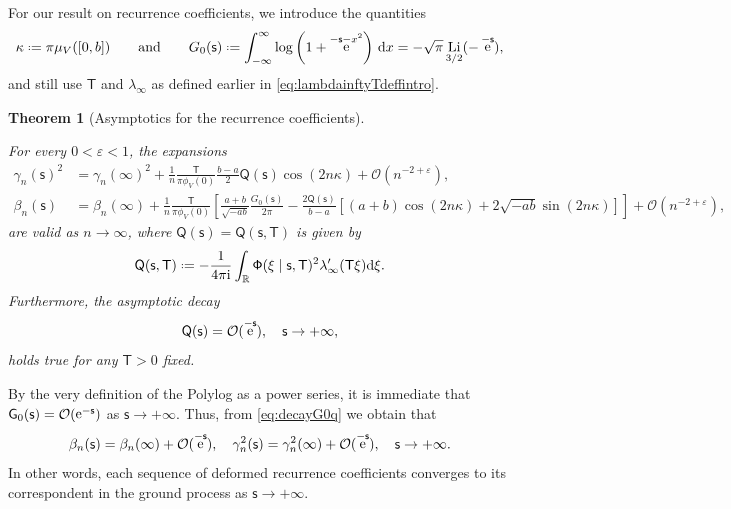 \documentclass[reqno,a4paper,11pt]{amsart}
\DeclareMathOperator{\ee}{\rm e}
\newcommand{\R}{\mathbb{R}}
\newcommand{\Boh}{\mathcal{O}}
\newcommand{\ii}{\mathrm{i}}
\newcommand{\dd}{\mathrm{d}}
\newcommand*{\deff}{\mathrel{\vcenter{\baselineskip0.5ex \lineskiplimit0pt
                     \hbox{\scriptsize.}\hbox{\scriptsize.}}}%
                     =}
\DeclareMathOperator{\Li}{Li}
\newcommand{\msf}{\mathsf}
\newcommand{\Tad}{\msf T}
\newcommand{\sad}{\msf s}
\newtheorem{theorem}{Theorem}[section]
\theoremstyle{definition}
\theoremstyle{remark}
\numberwithin{equation}{section}
\newcommand*{\defeq}{\mathrel{\vcenter{\baselineskip0.5ex \lineskiplimit0pt
                     \hbox{\scriptsize.}\hbox{\scriptsize.}}}%
                     =}
\begin{document}
For our result on recurrence coefficients, we introduce the quantities
%
    \[
        \kappa \defeq \pi \mu_V([0,b]) \qquad \text{and}\qquad
        G_0(\sad) \defeq  \int_{-\infty}^\infty \log \left(1 + \ee^{- \sad - x^2} \right) \, \dd x=-\sqrt{\pi}\Li_{3/2}(-\ee^{-\sad}),
    \]
and still use $\msf T$ and $\msf \lambda_\infty$ as defined earlier in \eqref{eq:lambdainftyTdeffintro}.

\begin{theorem}[Asymptotics for the recurrence coefficients] \label{thm:recurrence coeffs}
    
    For every $0 < \varepsilon < 1$, the expansions
\begin{equation}\label{eq:expRCmain}
    \begin{split}
    \gamma_n(\sad)^2 
        &= \gamma_n(\infty)^2 + \frac{1}{n} \frac{\Tad}{\pi \phi_V(0)} \frac{b-a}{2} \msf Q(\sad) \cos \left(2n \kappa \right) + \Boh(n^{-2 + \varepsilon}), \\
    \beta_n(\sad)
        &= \beta_n(\infty) + \frac{1}{n} \frac{\msf T}{\pi \phi_V(0)}\left[ \frac{a+b}{\sqrt{-ab}} \frac{G_0(\sad)}{2 \pi } -  \frac{2\msf Q(\sad)}{b-a} \left[ (a+b) \cos(2n \kappa) + 2 \sqrt{-ab} \sin (2n\kappa)\right]\right] + \Boh(n^{-2 + \varepsilon}),
    \end{split}
\end{equation}
%
are valid as $n\to \infty$, where $\msf Q(\sad)=\msf Q(\sad , \msf T)$ is given by
%
\begin{equation}\label{eq:integralreprQ}
\msf Q(\sad , \msf T) 
    \deff - \frac{1}{4\pi\ii } \int_{\R} \msf \Phi(\xi \mid \sad,\msf T)^2 \lambda_\infty'(\Tad \xi) \dd \xi .
\end{equation}
%
    Furthermore, the asymptotic decay
    \begin{equation}\label{eq:decayG0q}
        \msf Q(\sad) = \Boh(\ee^{- \sad}),  \quad \sad \to +\infty,
    \end{equation}
%
    holds true for any $\msf T>0$ fixed.
\end{theorem}

By the very definition of the Polylog as a power series, it is immediate that $\msf G_0(\sad)=\Boh(\ee^{-\sad})$ as $\sad\to +\infty$. Thus, from \eqref{eq:decayG0q} we obtain that
%
$$
\beta_n(\sad)=\beta_n(\infty)+\Boh(\ee^{-\sad}),\quad \gamma_n^2(\sad)=\gamma_n^2(\infty)+\Boh(\ee^{-\sad}),\quad \sad\to +\infty.
$$
%
In other words, each sequence of deformed recurrence coefficients converges to its correspondent in the ground process as $\sad \to +\infty$.
\end{document}
